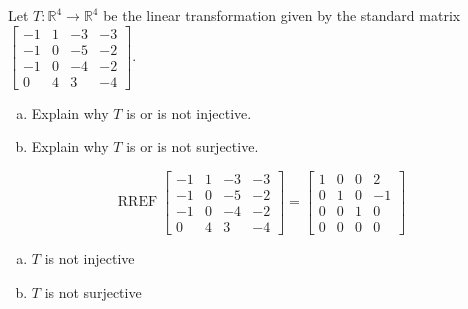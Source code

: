 
\begin{exerciseStatement}
 Let \(T:\mathbb{R}^ 4  \to \mathbb{R}^ 4 \) be the linear transformation given by the standard matrix \( \left[\begin{array}{cccc}
-1 & 1 & -3 & -3 \\
-1 & 0 & -5 & -2 \\
-1 & 0 & -4 & -2 \\
0 & 4 & 3 & -4
\end{array}\right] .\)
\begin{enumerate}[(a)]
\item Explain why \(T\) is or is not injective.
\item Explain why \(T\) is or is not surjective.
\end{enumerate}
    
\end{exerciseStatement}
    
\begin{exerciseAnswer} 


\[\operatorname{RREF} \left[\begin{array}{cccc}
-1 & 1 & -3 & -3 \\
-1 & 0 & -5 & -2 \\
-1 & 0 & -4 & -2 \\
0 & 4 & 3 & -4
\end{array}\right] = \left[\begin{array}{cccc}
1 & 0 & 0 & 2 \\
0 & 1 & 0 & -1 \\
0 & 0 & 1 & 0 \\
0 & 0 & 0 & 0
\end{array}\right] \]


\begin{enumerate}[(a)]
\item \(T\) is not injective
\item \(T\) is not surjective
\end{enumerate}
    
\end{exerciseAnswer}
    
